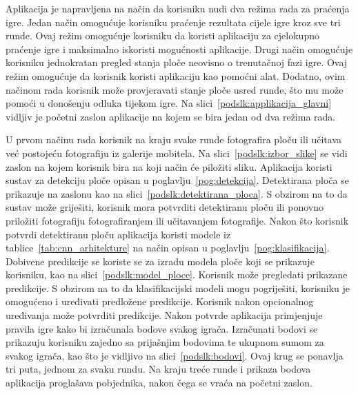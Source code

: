\documentclass[diplomskirad]{fer}
\begin{document}
		Aplikacija je napravljena na način da korisniku nudi dva režima rada za praćenja igre. Jedan način omogućuje korisniku praćenje rezultata cijele igre kroz sve tri runde. Ovaj režim omogućuje korisniku da koristi aplikaciju za cjelokupno praćenje igre i maksimalno iskoristi mogućnosti aplikacije. Drugi način omogućuje korisniku jednokratan pregled stanja ploče neovisno o trenutačnoj fazi igre. Ovaj režim omogućuje da korisnik koristi aplikaciju kao pomoćni alat. Dodatno, ovim načinom rada korisnik može provjeravati stanje ploče usred runde, što mu može pomoći u donošenju odluka tijekom igre. Na slici~\ref{podslk:applikacija_glavni} vidljiv je početni zaslon aplikacije na kojem se bira jedan od dva režima rada.
		
		U prvom načinu rada korisnik na kraju svake runde fotografira ploču ili učitava već postojeću fotografiju iz galerije mobitela. Na slici~\ref{podslk:izbor_slike} se vidi zaslon na kojem korisnik bira na koji način će piložiti sliku. Aplikacija koristi sustav za detekciju ploče opisan u poglavlju~\ref{pog:detekcija}. Detektirana ploča se prikazuje na zaslonu kao na slici~\ref{podslk:detektirana_ploca}. S obzirom na to da sustav može griješiti, korisnik mora potvrditi detektiranu ploču ili ponovno priložiti fotografiju fotografiranjem ili učitavanjem fotografije. Nakon što korisnik potvrdi detektiranu ploču aplikacija koristi modele iz tablice~\ref{tab:cnn_arhitekture} na način opisan u poglavlju~\ref{pog:klasifikacija}. Dobivene predikcije se koriste se za izradu modela ploče koji se prikazuje korisniku, kao na slici~\ref{podslk:model_ploce}. Korisnik može pregledati prikazane predikcije. S obzirom na to da klasifikacijski modeli mogu pogriješiti, korisniku je omogućeno i uređivati predložene predikcije. Korisnik nakon opcionalnog uređivanja može potvrditi predikcije. Nakon potvrde aplikacija primjenjuje pravila igre kako bi izračunala bodove svakog igrača. Izračunati bodovi se prikazuju korisniku zajedno sa prijašnjim bodovima te ukupnom sumom za svakog igrača, kao što je vidljivo na slici~\ref{podslk:bodovi}. Ovaj krug se ponavlja tri puta, jednom za svaku rundu. Na kraju treće runde i prikaza bodova aplikacija proglašava pobjednika, nakon čega se vraća na početni zaslon.
		
\end{document}

